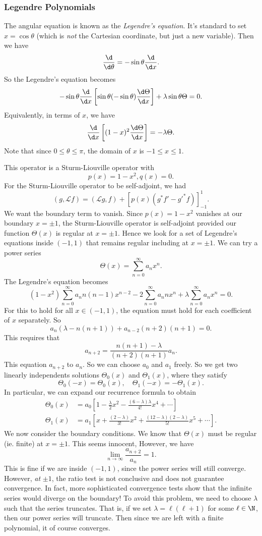 \documentclass[a4paper]{article}
\begin{document}
\subsubsection{Legendre Polynomials}
The angular equation is known as the \emph{Legendre's equation}. It's standard to set $x = \cos \theta$ (which is \emph{not} the Cartesian coordinate, but just a new variable). Then we have
\[
  \frac{\d}{\d \theta} = -\sin \theta \frac{\d}{\d x}.
\]
So the Legendre's equation becomes
\[
  -\sin \theta \frac{\d}{\d x}\left[\sin \theta (-\sin \theta) \frac{\d \Theta}{\d x}\right]+ \lambda \sin \theta \Theta = 0.
\]
Equivalently, in terms of $x$, we have
\[
  \frac{\d}{\d x}\left[(1 - x)^2 \frac{\d \Theta}{\d x}\right] = -\lambda \Theta.
\]
Note that since $0 \leq \theta \leq \pi$, the domain of $x$ is $-1 \leq x \leq 1$.

This operator is a Sturm-Liouville operator with
\[
  p(x) = 1 - x^2, q(x) = 0.
\]
For the Sturm-Liouville operator to be self-adjoint, we had
\[
  (g, \mathcal{L} f) = (\mathcal{L}g, f) + [p(x) (g^* f' - g'^* f)]^{1}_{-1}.
\]
We want the boundary term to vanish. Since $p(x) = 1- x^2$ vanishes at our boundary $x = \pm 1$, the Sturm-Liouville operator is self-adjoint provided our function $\Theta(x)$ is regular at $x = \pm 1$. Hence we look for  a set of Legendre's equations inside $(-1, 1)$ that remains regular including at $x = \pm 1$. We can try a power series
\[
  \Theta(x) = \sum_{n = 0}^\infty a_n x^n.
\]
The Legendre's equation becomes
\[
  (1 - x^2) \sum_{n = 0}^\infty a_n n(n - 1)x^{n - 2} - 2\sum_{n = 0}^\infty a_n nx^n + \lambda \sum_{n = 0}^\infty a_n x^n = 0.
\]
For this to hold for all $x\in (-1, 1)$, the equation must hold for each coefficient of $x$ separately. So
\[
  a_n(\lambda - n(n + 1)) + a_{n - 2}(n + 2)(n + 1) = 0.
\]
This requires that
\[
  a_{n + 2} = \frac{n(n + 1) - \lambda}{(n + 2)(n + 1)} a_n.
\]
This equation $a_{n + 2}$ to $a_n$. So we can choose $a_0$ and $a_1$ freely. So we get two linearly independents solutions $\Theta_0(x)$ and $\Theta_1(x)$, where they satisfy
\[
  \Theta_0(-x) = \Theta_0(x), \quad \Theta_1(-x) = -\Theta_1(x).
\]
In particular, we can expand our recurrence formula to obtain
\begin{align*}
  \Theta_0(x) &= a_0 \left[1 - \frac{\lambda}{2} x^2 - \frac{(6 - \lambda)\lambda}{4!}x^4 + \cdots\right]\\
  \Theta_1(x) &= a_1 \left[x + \frac{(2 - \lambda)}{3!}x^2 + \frac{(12 - \lambda)(2 - \lambda)}{5!}x^5 + \cdots\right].
\end{align*}
We now consider the boundary conditions. We know that $\Theta(x)$ must be regular (ie. finite) at $x = \pm 1$. This seems innocent, However, we have
\[
  \lim_{n \to \infty}\frac{a_{n + 2}}{a_n} = 1.
\]
This is fine if we are inside $(-1, 1)$, since the power series will still converge. However, \emph{at} $\pm 1$, the ratio test is not conclusive and does not guarantee convergence. In fact, more sophisticated convergence tests show that the infinite series would diverge on the boundary! To avoid this problem, we need to choose $\lambda$ such that the series truncates. That is, if we set $\lambda = \ell(\ell + 1)$ for some $\ell \in \N$, then our power series will truncate. Then since we are left with a finite polynomial, it of course converges.
\end{document}
